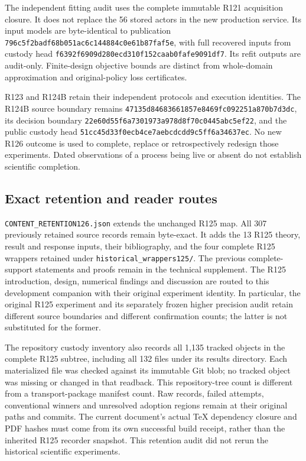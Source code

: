 The independent fitting audit uses the complete immutable R121 acquisition
closure. It does not replace the 56 stored actors in the new production service.
Its input models are byte-identical to publication
\nolinkurl{796c5f2badf68b051ac6c144884c0e61b87faf5e}, with full recovered inputs
from custody head \nolinkurl{f6392f6909d280ecd310f152caab0fafe9091df7}.
Its refit outputs are audit-only. Finite-design objective bounds are distinct
from whole-domain approximation and original-policy loss certificates.

R123 and R124B retain their independent protocols and execution identities.
The R124B source boundary remains
\nolinkurl{47135d84683661857e8469fc092251a870b7d3dc}, its decision boundary
\nolinkurl{22e60d55f6a7301973a978d8f70c0445abc5ef22}, and the public custody
head \nolinkurl{51cc45d33f0ecb4ce7aebcdcdd9c5ff6a34637ec}.
No new R126 outcome is used to complete, replace or retrospectively redesign
those experiments. Dated observations of a process being live or absent do not
establish scientific completion.

\subsection{Exact retention and reader routes}

\nolinkurl{CONTENT_RETENTION126.json} extends the unchanged R125 map. All 307
previously retained source records remain byte-exact. It adds the 13 R125 theory,
result and response inputs, their bibliography, and the four complete R125
wrappers retained under \nolinkurl{historical_wrappers125/}. The previous
complete-support statements and proofs remain in the technical supplement.
The R125 introduction, design, numerical findings and discussion are routed to
this development companion with their original experiment identity. In
particular, the original R125 experiment and its separately frozen higher
precision audit retain different source boundaries and different confirmation
counts; the latter is not substituted for the former.

The repository custody inventory also records all 1,135 tracked objects in the
complete R125 subtree, including all 132 files under its results directory.
Each materialized file was checked against its immutable Git blob; no tracked
object was missing or changed in that readback. This repository-tree count is
different from a transport-package manifest count. Raw records, failed attempts,
conventional winners and unresolved adoption regions remain at their original
paths and commits. The current document's actual TeX dependency closure and PDF
hashes must come from its own successful build receipt, rather than the inherited
R125 recorder snapshot. This retention audit did not rerun the historical
scientific experiments.
